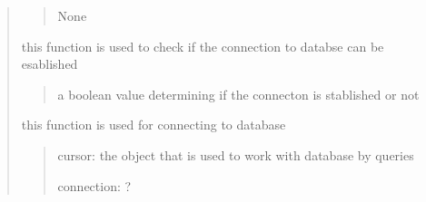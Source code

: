 \documentclass[letterpaper,10pt,english]{sphinxmanual}
\begin{document}
\begin{quote}
\begin{savenotes}
\begin{fulllineitems}
\begin{savenotes}
\begin{fulllineitems}
\begin{quote}
\begin{description}
\begin{itemize}
\end{itemize}

\sphinxAtStartPar
None

\end{description}\end{quote}

\end{fulllineitems}\end{savenotes}


\begin{savenotes}\begin{fulllineitems}
\label{\detokenize{setting/database:oxin.database.dataBase.check_connection}}
\pysigstartsignatures
{}
\pysigstopsignatures
\sphinxAtStartPar
this function is used to check if the connection to databse can be esablished
\begin{quote}\begin{description}
\sphinxAtStartPar
a boolean value determining if the connecton is stablished or not

\end{description}\end{quote}

\end{fulllineitems}\end{savenotes}


\begin{savenotes}\begin{fulllineitems}
\label{\detokenize{setting/database:oxin.database.dataBase.connect}}
\pysigstartsignatures
{}
\pysigstopsignatures
\sphinxAtStartPar
this function is used for connecting to database
\begin{quote}\begin{description}
\sphinxAtStartPar
cursor: the object that is used to work with database by queries

\sphinxAtStartPar
connection: ?

\end{description}\end{quote}


\end{fulllineitems}
\end{savenotes}
\end{fulllineitems}
\end{savenotes}
\end{quote}
\end{document}
